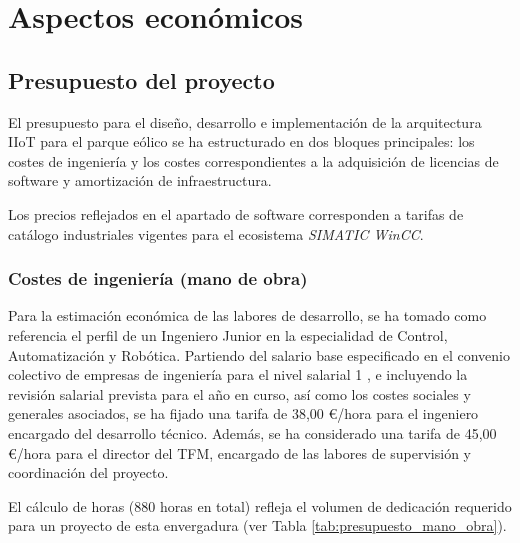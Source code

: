 \chapter{Aspectos económicos}
\label{cap:económicos}
\titlespacing{\section}{0em}{.75em}{.2em}
\titlespacing{\subsection}{0em}{.5em}{0em}
\section{Presupuesto del proyecto}
El presupuesto para el diseño, desarrollo e implementación de la arquitectura IIoT para el parque eólico se ha estructurado en dos bloques principales: los costes de ingeniería y los costes correspondientes a la adquisición de licencias de software y amortización de infraestructura.

Los precios reflejados en el apartado de software corresponden a tarifas de catálogo industriales vigentes para el ecosistema \textit{SIMATIC WinCC}.

\subsection{Costes de ingeniería (mano de obra)}
Para la estimación económica de las labores de desarrollo, se ha tomado como referencia el perfil de un Ingeniero Junior en la especialidad de Control, Automatización y Robótica. Partiendo del salario base especificado en el convenio colectivo de empresas de ingeniería para el nivel salarial 1 \cite{boe_convenio_ingenierias_2024}, e incluyendo la revisión salarial prevista para el año en curso, así como los costes sociales y generales asociados, se ha fijado una tarifa de 38,00 €/hora para el ingeniero encargado del desarrollo técnico. Además, se ha considerado una tarifa de 45,00 €/hora para el director del TFM, encargado de las labores de supervisión y coordinación del proyecto.

El cálculo de horas (880 horas en total) refleja el volumen de dedicación requerido para un proyecto de esta envergadura (ver Tabla \ref{tab:presupuesto_mano_obra}).

\begin{table}[tbp]
\centering
\caption{Presupuesto de ingeniería y desarrollo técnico.}
\label{tab:presupuesto_mano_obra}
\end{table}

